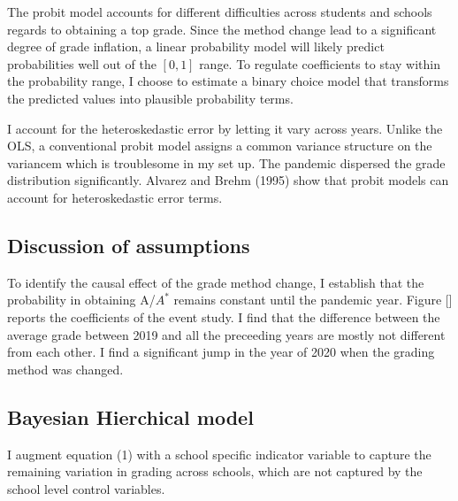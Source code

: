 The probit model accounts for different difficulties across students and schools regards to obtaining a top grade. Since the method change lead to a significant degree of grade inflation, a linear probability model will likely predict probabilities well out of the $[0, 1]$ range. To regulate coefficients to stay within the probability range, I choose to estimate a binary choice model that transforms the predicted values into plausible probability terms. 

I account for the heteroskedastic error by letting it vary across years. Unlike the OLS, a conventional probit model assigns a common variance structure on the variancem which is troublesome in my set up. The pandemic dispersed the grade distribution significantly. Alvarez and Brehm (1995) show that probit models can account for heteroskedastic error terms. 

\subsection{Discussion of assumptions}
To identify the causal effect of the grade method change, I establish that the probability in obtaining A/$A^*$ remains constant until the pandemic year. Figure [] reports the coefficients of the event study. I find that the difference between the average grade between 2019 and all the preceeding years are mostly not different from each other. I find a significant jump in the year of 2020 when the grading method was changed. 


\subsection{Bayesian Hierchical model}
I augment equation (1) with a school specific indicator variable to capture the remaining variation in grading across schools, which are not captured by the school level control variables. 

